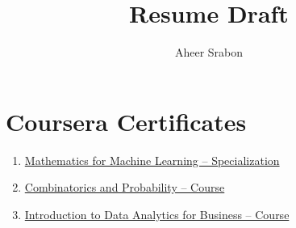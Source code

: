 

\title{Resume Draft}
\author{Aheer Srabon}
\date{}


\maketitle

\section{Coursera Certificates}
\begin{enumerate}
    \item \href{https://coursera.org/share/632b82b9ea62155916f7025ea6898f26}{Mathematics for Machine Learning -- Specialization}
    \item \href{https://coursera.org/share/dfc19fe82d7f6805a688de47b0f614b9}{Combinatorics and Probability -- Course}
    \item \href{https://coursera.org/share/1679cf69f4440db727b83367df0e660f}{Introduction to Data Analytics for Business -- Course}
\end{enumerate}


